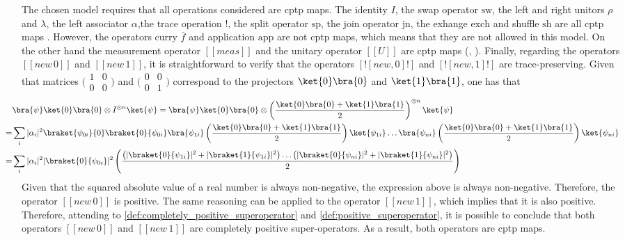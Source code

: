 The chosen model requires that all operations considered are \acrshort{cptp} maps. The identity $I$, the swap operator $\text{sw}$, the left and right unitors $\rho$ and $\lambda$, the left associator $\alpha$,the trace operation $!$, the split operator $\text{sp}$, the join operator $\text{jn}$, the exhange $\text{exch}$ and shuffle $\text{sh}$ are all  \acrshort{cptp} maps \cite{dahlqvist2022syntactic}. However, the operators curry $\overline{f}$ and application $\text{app}$ are not \acrshort{cptp} maps, which means that they are not allowed in this model. On the other hand the measurement operator $[\![\textit{meas}]\!]$ and the unitary operator $[\![\textit{U}]\!]$ are \acrshort{cptp} maps (, \cite[page 73]{watrous2018theory}). Finally, regarding the operators  $[\![\textit{new} \,0 ]\!]$ and $[\![\textit{new} \, 1 ] \!]$, it is straightforward to verify that the operators $[![\textit{new} ,0]!]$ and $[![\textit{new} ,1]!]$ are trace-preserving. Given that matrices $\big(\begin{smallmatrix} 1 & 0\\ 0 & 0 \end{smallmatrix}\big)$ and $\big(\begin{smallmatrix} 0 & 0\\ 0 & 1 \end{smallmatrix}\big)$ correspond to the projectors $\ket{0}\bra{0}$ and $\ket{1}\bra{1}$, one has that 
\begin{align*}
  \hspace{-20pt} &  \bra{\psi} \ket{0}\bra{0} \otimes I^{\otimes n} \ket{\psi}  = \bra{\psi} \ket{0}\bra{0} \otimes \left(\frac{\ket{0}\bra{0} + \ket{1}\bra{1}}{2}\right)^{\otimes n} \ket{\psi} \\
  \hspace{-20pt} =  &  \sum_{i} |\alpha_i|^{2} \braket{\psi_{0i}}{0}\braket{0}{\psi_{0i}} \bra{\psi_{1i}} \left(\frac{\ket{0}\bra{0} + \ket{1}\bra{1}}{2}\right)\ket{\psi_{1i}} \ldots \bra{\psi_{ni}} \left(\frac{\ket{0}\bra{0} + \ket{1}\bra{1}}{2}\right)\ket{\psi_{ni}}   \\
  \hspace{-20pt} = & \sum_{i}  |\alpha_i|^{2} |\braket{0}{\psi_{0i}}|^{2} \left( \frac{ \left( |\braket{0}{\psi_{1i}}|^{2} +  |\braket{1}{\psi_{1i}}|^{2} \right) \ldots \left( |\braket{0}{\psi_{ni}}|^{2} +  |\braket{1}{\psi_{ni}}|^{2} \right) }{2}  \right)    \\
\end{align*}
Given that the squared absolute value of a real number is always non-negative, the expression above is always non-negative. Therefore, the operator $[\![\textit{new} \,0 ]\!]$ is positive. The same reasoning can be applied to the operator $[\![\textit{new} \,1 ]\!]$, which implies that it is also positive. Therefore, attending to \autoref{def:completely_positive_superoperator} and \autoref{def:positive_superoperator}, it is possible to conclude that both operators $[\![\textit{new} \,0 ]\!]$ and $[\![\textit{new} \, 1 ] \!]$ are completely positive super-operators. As a result, both operators are \acrshort{cptp} maps.

